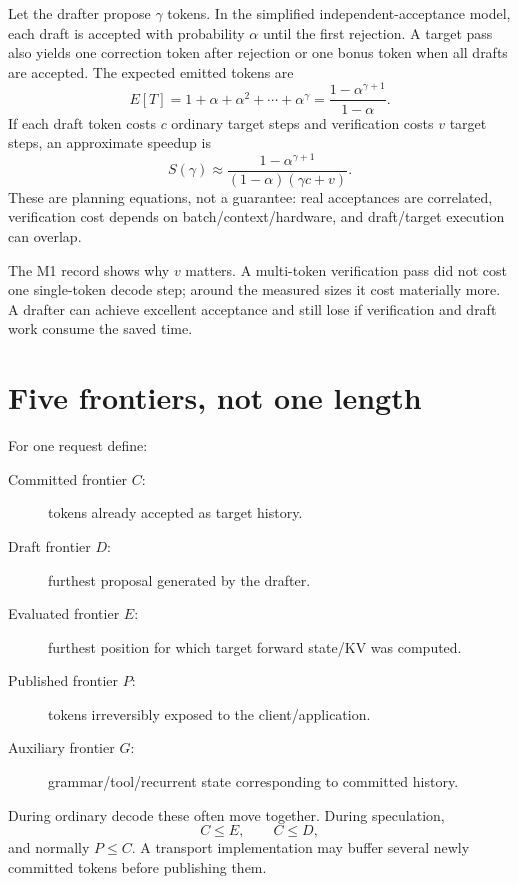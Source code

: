 
Let the drafter propose $\gamma$ tokens. In the simplified independent-acceptance
model, each draft is accepted with probability $\alpha$ until the first rejection.
A target pass also yields one correction token after rejection or one bonus token when
all drafts are accepted. The expected emitted tokens are
\begin{equation}
E[T]=1+\alpha+\alpha^2+\cdots+\alpha^\gamma
=\frac{1-\alpha^{\gamma+1}}{1-\alpha}.
\label{eq:spec-etokens}
\end{equation}
If each draft token costs $c$ ordinary target steps and verification costs $v$ target
steps, an approximate speedup is
\begin{equation}
S(\gamma)\approx
\frac{1-\alpha^{\gamma+1}}
{(1-\alpha)(\gamma c+v)}.
\label{eq:spec-speed}
\end{equation}
These are planning equations, not a guarantee: real acceptances are correlated,
verification cost depends on batch/context/hardware, and draft/target execution can
overlap.

The M1 record shows why $v$ matters. A multi-token verification pass did not cost one
single-token decode step; around the measured sizes it cost materially more. A
drafter can achieve excellent acceptance and still lose if verification and draft work
consume the saved time.

\section{Five frontiers, not one length}

For one request define:
\begin{description}
\item[Committed frontier $C$:] tokens already accepted as target history.
\item[Draft frontier $D$:] furthest proposal generated by the drafter.
\item[Evaluated frontier $E$:] furthest position for which target forward state/KV was computed.
\item[Published frontier $P$:] tokens irreversibly exposed to the client/application.
\item[Auxiliary frontier $G$:] grammar/tool/recurrent state corresponding to committed history.
\end{description}
During ordinary decode these often move together. During speculation,
\[
C\le E,\qquad C\le D,
\]
and normally $P\le C$. A transport implementation may buffer several newly committed
tokens before publishing them.

